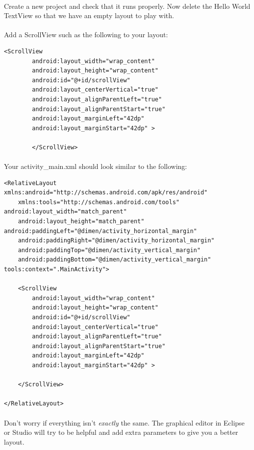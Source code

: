\documentclass[12pt, a4paper, twoside]{book}
\begin{document}
\paragraph{} Create a new project and check that it runs properly. Now delete the Hello World TextView so that we have an empty layout to play with.

\paragraph{} Add a ScrollView such as the following to your layout:

\begin{lstlisting}
<ScrollView
        android:layout_width="wrap_content"
        android:layout_height="wrap_content"
        android:id="@+id/scrollView"
        android:layout_centerVertical="true"
        android:layout_alignParentLeft="true"
        android:layout_alignParentStart="true"
        android:layout_marginLeft="42dp"
        android:layout_marginStart="42dp" >

        </ScrollView>
\end{lstlisting}

\paragraph{} Your activity\_main.xml should look similar to the following:

\begin{lstlisting}
<RelativeLayout xmlns:android="http://schemas.android.com/apk/res/android"
    xmlns:tools="http://schemas.android.com/tools" android:layout_width="match_parent"
    android:layout_height="match_parent" android:paddingLeft="@dimen/activity_horizontal_margin"
    android:paddingRight="@dimen/activity_horizontal_margin"
    android:paddingTop="@dimen/activity_vertical_margin"
    android:paddingBottom="@dimen/activity_vertical_margin" tools:context=".MainActivity">

    <ScrollView
        android:layout_width="wrap_content"
        android:layout_height="wrap_content"
        android:id="@+id/scrollView"
        android:layout_centerVertical="true"
        android:layout_alignParentLeft="true"
        android:layout_alignParentStart="true"
        android:layout_marginLeft="42dp"
        android:layout_marginStart="42dp" >
         
    </ScrollView>

</RelativeLayout>
\end{lstlisting}
\paragraph{} Don't worry if everything isn't \emph{exactly} the same. The graphical editor in Eclipse or Studio will try to be helpful and add extra parameters to give you a better layout.
\end{document}
